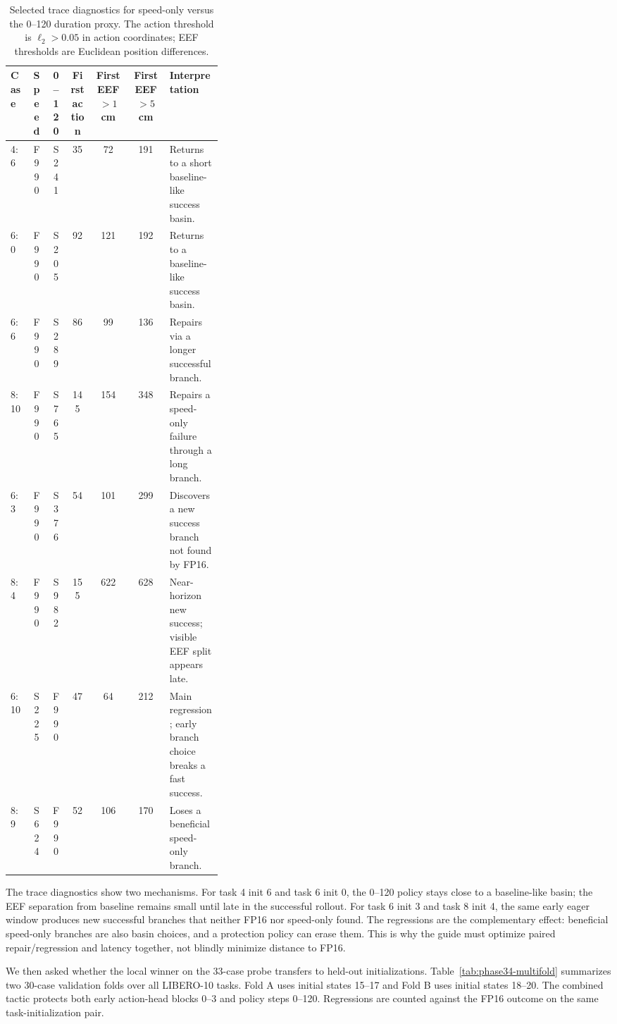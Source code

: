 \documentclass[10pt]{article}
\begin{document}
\begin{table}[H]
\centering
\scriptsize
\setlength{\tabcolsep}{2.5pt}
\caption{Selected trace diagnostics for speed-only versus the 0--120 duration proxy. The action threshold is $\ell_2>0.05$ in action coordinates; EEF thresholds are Euclidean position differences.}
\label{tab:duration-trace-divergence}
\begin{tabular}{p{0.10\linewidth}ccccc p{0.25\linewidth}}
\toprule
Case & Speed & 0--120 & First action & First EEF $>1$ cm & First EEF $>5$ cm & Interpretation \\
\midrule
4:6 & F990 & S241 & 35 & 72 & 191 & Returns to a short baseline-like success basin. \\
6:0 & F990 & S205 & 92 & 121 & 192 & Returns to a baseline-like success basin. \\
6:6 & F990 & S289 & 86 & 99 & 136 & Repairs via a longer successful branch. \\
8:10 & F990 & S765 & 145 & 154 & 348 & Repairs a speed-only failure through a long branch. \\
6:3 & F990 & S376 & 54 & 101 & 299 & Discovers a new success branch not found by FP16. \\
8:4 & F990 & S982 & 155 & 622 & 628 & Near-horizon new success; visible EEF split appears late. \\
6:10 & S225 & F990 & 47 & 64 & 212 & Main regression; early branch choice breaks a fast success. \\
8:9 & S624 & F990 & 52 & 106 & 170 & Loses a beneficial speed-only branch. \\
\bottomrule
\end{tabular}
\end{table}

The trace diagnostics show two mechanisms. For task 4 init 6 and task 6 init 0, the 0--120 policy stays close to a baseline-like basin; the EEF separation from baseline remains small until late in the successful rollout. For task 6 init 3 and task 8 init 4, the same early eager window produces new successful branches that neither FP16 nor speed-only found. The regressions are the complementary effect: beneficial speed-only branches are also basin choices, and a protection policy can erase them. This is why the guide must optimize paired repair/regression and latency together, not blindly minimize distance to FP16.

We then asked whether the local winner on the 33-case probe transfers to held-out initializations. Table~\ref{tab:phase34-multifold} summarizes two 30-case validation folds over all LIBERO-10 tasks. Fold A uses initial states 15--17 and Fold B uses initial states 18--20. The combined tactic protects both early action-head blocks 0--3 and policy steps 0--120. Regressions are counted against the FP16 outcome on the same task-initialization pair.
\end{document}
